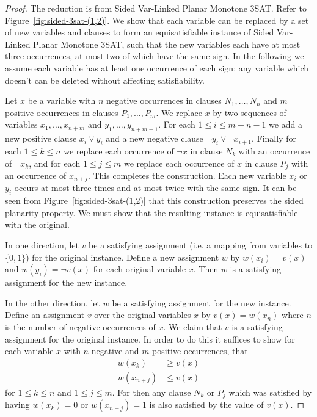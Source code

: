 \documentclass[11pt,letterpaper]{article}
\theoremstyle{plain}
\theoremstyle{definition}
\theoremstyle{remark}
\numberwithin{equation}{section}
\begin{document}
\begin{proof}
  The reduction is from Sided Var-Linked Planar Monotone 3SAT.
  Refer to Figure~\ref{fig:sided-3sat-(1,2)}.
  We show that each variable can be replaced by a set of new variables and clauses to form an equisatisfiable instance of Sided Var-Linked Planar Monotone 3SAT, such that the new variables each have at most three occurrences, at most two of which have the same sign.
  In the following we assume each variable has at least one occurrence of each sign; any variable which doesn't can be deleted without affecting satisfiability.

  Let \(x\) be a variable with \(n\) negative occurrences in clauses \(N_1, \dots, N_n\) and  \(m\) positive occurrences in clauses \(P_1, \dots, P_m\).
  We replace \(x\) by two sequences of variables \(x_1, \dots, x_{n+m}\) and \(y_1, \dots, y_{n+m-1}\).
  For each \(1 \le i \le m + n - 1\) we add a new positive clause \(x_i \vee y_i\) and a new negative clause \(\neg y_i \vee \neg x_{i+1}\).
  Finally for each \(1 \le k \le n\) we replace each occurrence of \(\neg x\) in clause \(N_k\) with an occurrence of \(\neg x_k\), and for each \(1 \le j \le m\) we replace each occurrence of \(x\) in clause \(P_j\) with an occurrence of \(x_{n+j}\).
  This completes the construction.  Each new variable \(x_i\) or \(y_i\) occurs at most three times and at most twice with the same sign.  It can be seen from Figure~\ref{fig:sided-3sat-(1,2)} that this construction preserves the sided planarity property.  We must show that the resulting instance is equisatisfiable with the original.

  In one direction, let \(v\) be a satisfying assignment (i.e. a mapping from variables to \(\{0, 1\}\)) for the original instance.
  Define a new assignment \(w\) by \(w(x_i) = v(x)\) and \(w(y_i) = \neg v(x)\) for each original variable \(x\).
  Then \(w\) is a satisfying assignment for the new instance.

  In the other direction, let \(w\) be a satisfying assignment for the new instance.
  Define an assignment \(v\) over the original variables \(x\) by \(v(x) = w(x_n)\) where \(n\) is the number of negative occurrences of \(x\).
  We claim that \(v\) is a satisfying assignment for the original instance.
  In order to do this it suffices to show for each variable \(x\) with \(n\) negative and \(m\) positive occurrences,
  that
  \begin{equation}
    \label{eqn:wvsat}
    \begin{aligned}
      w(x_k) &\ge v(x) \\
      w(x_{n+j}) &\le v(x)
    \end{aligned}
  \end{equation}
  for \(1 \le k \le n\) and \(1 \le j \le m\).
  For then any clause \(N_k\) or \(P_j\) which was satisfied by having \(w(x_k) = 0\) or \(w(x_{n+j}) = 1\)
  is also satisfied by the value of \(v(x)\).


\end{proof}
\end{document}
